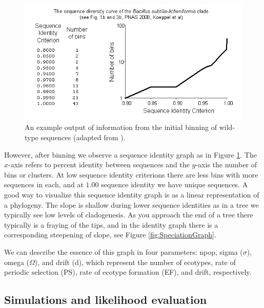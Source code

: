 \begin{figure}[h!]
 \centering
 \label{fig:Binning}
 \includegraphics[scale=1.75]{images/Binning-CH2}
 \caption[Sequence identity graph and example output produced by binning \protect\cite{koeppel2008identifying}.]{An example output of information from the initial binning of wild-type sequences (adapted from \protect\cite{koeppel2008identifying}). }
\end{figure}

However, after binning we observe a sequence identity graph as in Figure \ref{fig:Binning}.
The $x$-axis refers to percent identity between sequences and the $y$-axis the number of bins or clusters.
At low sequence identity criterions there are less bins with more sequences in each, and at $1.00$ sequence identity we have unique sequences.
A good way to visualize this sequence identity graph is as a linear representation of a phylogeny.
The slope is shallow during lower sequence identities as in a tree we typically see low levels of cladogenesis.
As you approach the end of a tree there typically is a fraying of the tips, and in the identity graph there is a corresponding steepening of slope, see Figure \ref{fig:SpeciationGraph}. %

We can describe the essence of this graph in four parameters: npop, sigma ($\sigma$), omega ($\Omega$), and drift (d), which represent the number of ecotypes, rate of periodic selection (PS), rate of ecotype formation (EF), and drift, respectively.

\subsection*{Simulations and likelihood evaluation}


